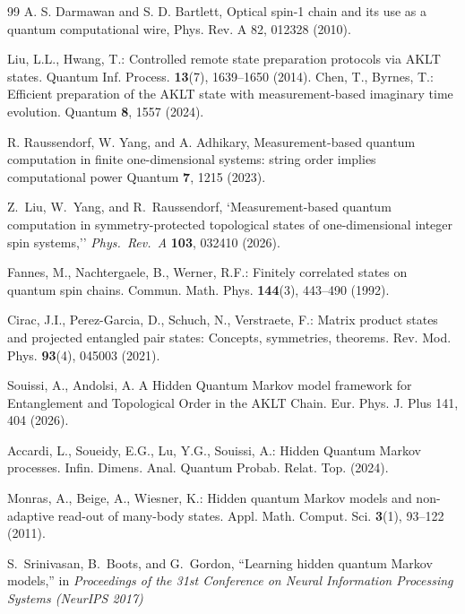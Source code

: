 \documentclass[11pt,a4paper]{article}
\begin{document}
\begin{thebibliography}{99}
A. S. Darmawan and S. D. Bartlett, Optical spin-1 chain and its use as a quantum computational wire, Phys. Rev. A 82, 012328 (2010).

Liu, L.L., Hwang, T.: Controlled remote state preparation protocols via AKLT states.
Quantum Inf. Process. \textbf{13}(7), 1639--1650 (2014).
Chen, T., Byrnes, T.: Efficient preparation of the AKLT state with measurement-based imaginary time evolution.
Quantum \textbf{8}, 1557 (2024).

R. Raussendorf, W. Yang, and A. Adhikary,
Measurement-based quantum computation in finite one-dimensional systems: string order implies computational power
Quantum \textbf{7}, 1215 (2023).

 Z.~Liu, W.~Yang, and R.~Raussendorf, `Measurement-based quantum computation in symmetry-protected topological states of one-dimensional integer spin systems,''
\emph{Phys.\ Rev.\ A} \textbf{103}, 032410 (2026).

Fannes, M., Nachtergaele, B., Werner, R.F.:
Finitely correlated states on quantum spin chains.
Commun. Math. Phys. \textbf{144}(3), 443--490 (1992).

Cirac, J.I., Perez-Garcia, D., Schuch, N., Verstraete, F.:
Matrix product states and projected entangled pair states: Concepts, symmetries, theorems.
Rev. Mod. Phys. \textbf{93}(4), 045003 (2021).



Souissi, A., Andolsi, A. 
A Hidden Quantum Markov model framework for Entanglement and Topological Order in the AKLT Chain.
Eur. Phys. J. Plus 141, 404 (2026).

Accardi, L., Soueidy, E.G., Lu, Y.G., Souissi, A.:
Hidden Quantum Markov processes.
Infin. Dimens. Anal. Quantum Probab. Relat. Top. (2024).





Monras, A., Beige, A., Wiesner, K.:
Hidden quantum Markov models and non-adaptive read-out of many-body states.
Appl. Math. Comput. Sci. \textbf{3}(1), 93--122 (2011).


S.~Srinivasan, B.~Boots, and G.~Gordon,
``Learning hidden quantum Markov models,''
in \emph{Proceedings of the 31st Conference on Neural Information Processing Systems (NeurIPS 2017)}


\end{thebibliography}
\end{document}
